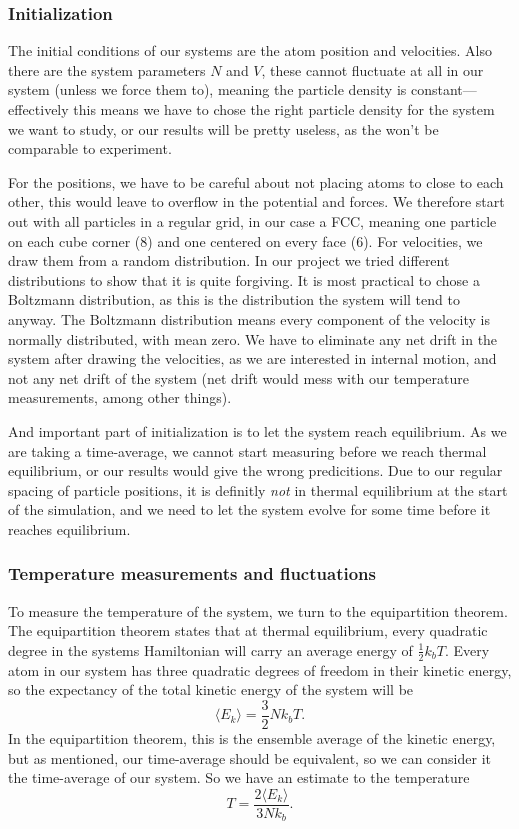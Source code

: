 \documentclass[a4paper, 11pt, notitlepage, english]{article}
\begin{document}
\subsubsection*{Initialization}

The initial conditions of our systems are the atom position and velocities. Also there are the system parameters $N$ and $V$, these cannot fluctuate at all in our system (unless we force them to), meaning the particle density is constant---effectively this means we have to chose the right particle density for the system we want to study, or our results will be pretty useless, as the won't be comparable to experiment.

For the positions, we have to be careful about not placing atoms to close to each other, this would leave to overflow in the potential and forces. We therefore start out with all particles in a regular grid, in our case a FCC, meaning one particle on each cube corner (8) and one centered on every face (6). For velocities, we draw them from a random distribution. In our project we tried different distributions to show that it is quite forgiving. It is most practical to chose a Boltzmann distribution, as this is the distribution the system will tend to anyway. The Boltzmann distribution means every component of the velocity is normally distributed, with mean zero. We have to eliminate any net drift in the system after drawing the velocities, as we are interested in internal motion, and not any net drift of the system (net drift would mess with our temperature measurements, among other things).

And important part of initialization is to let the system reach equilibrium. As we are taking a time-average, we cannot start measuring before we reach thermal equilibrium, or our results would give the wrong predicitions. Due to our regular spacing of particle positions, it is definitly \emph{not} in thermal equilibrium at the start of the simulation, and we need to let the system evolve for some time before it reaches equilibrium.

\clearpage 

\subsubsection*{Temperature measurements and fluctuations}

 To measure the temperature of the system, we turn to the equipartition theorem. The equipartition theorem states that at thermal equilibrium, every quadratic degree in the systems Hamiltonian will carry an average energy of $\frac{1}{2}k_b T$. Every atom in our system has three quadratic degrees of freedom in their kinetic energy, so the expectancy of the total kinetic energy of the system will be 
$$\langle E_k \rangle = \frac{3}{2}Nk_bT.$$
In the equipartition theorem, this is the ensemble average of the kinetic energy, but as mentioned, our time-average should be equivalent, so we can consider it the time-average of our system. So we have an estimate to the temperature
$$T = \frac{2\langle E_k \rangle}{3Nk_b}.$$
\end{document}
